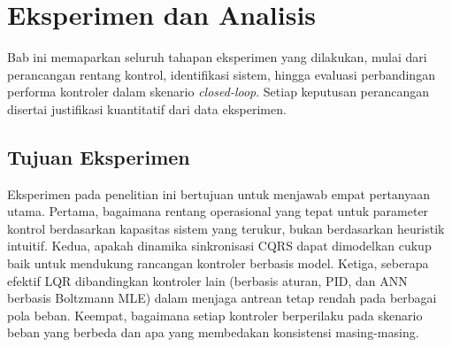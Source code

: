 \chapter{Eksperimen dan Analisis}

Bab ini memaparkan seluruh tahapan eksperimen yang dilakukan, mulai dari perancangan rentang kontrol,
identifikasi sistem, hingga evaluasi perbandingan performa kontroler dalam
skenario \emph{closed-loop}.
Setiap keputusan perancangan disertai justifikasi kuantitatif dari data eksperimen.


\newcommand{\openloopsamples}{8146}
\newcommand{\openloopsteps}{122}
\newcommand{\openloopinterval}{1}

\newcommand{\tfetchms}{203}
\newcommand{\batchminCap}{3}
\newcommand{\batchmaxCap}{2036}
\newcommand{\pollminCap}{604}
\newcommand{\pollmaxCap}{1599}
\newcommand{\kneepoint}{500}
\newcommand{\kneeCpu}{31.5}
\newcommand{\docsizeKB}{0.463}

\newcommand{\escpus}{1,0}
\newcommand{\esmemory}{1024 MB}
\newcommand{\esjavaheap}{512 MB}
\newcommand{\esversion}{8.10.0}

\newcommand{\closedlooprun}{closed\_loop\_20260415\_231610}
\newcommand{\closedloopsamples}{1930}

\newcommand{\normQueueMean}{0}
\newcommand{\normQueueStd}{5000}
\newcommand{\normBatchMean}{250}
\newcommand{\normBatchStd}{250}
\newcommand{\normInvPollMean}{5,0}
\newcommand{\normInvPollStd}{2,0}


\section{Tujuan Eksperimen}

Eksperimen pada penelitian ini bertujuan untuk menjawab empat pertanyaan utama.
Pertama, bagaimana rentang operasional yang tepat untuk parameter kontrol berdasarkan kapasitas sistem
yang terukur, bukan berdasarkan heuristik intuitif.
Kedua, apakah dinamika sinkronisasi CQRS dapat dimodelkan cukup baik untuk mendukung rancangan
kontroler berbasis model.
Ketiga, seberapa efektif LQR dibandingkan kontroler lain (berbasis aturan, PID, dan ANN
berbasis Boltzmann MLE) dalam menjaga antrean tetap rendah pada berbagai pola beban.
Keempat, bagaimana setiap kontroler berperilaku pada skenario beban yang berbeda dan apa yang
membedakan konsistensi masing-masing.

